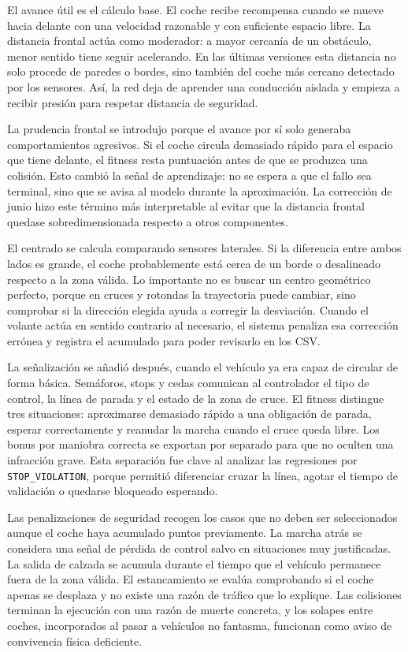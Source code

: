 El avance útil es el cálculo base. El coche recibe recompensa cuando se mueve hacia delante con una velocidad razonable y con suficiente espacio libre. La distancia frontal actúa como moderador: a mayor cercanía de un obstáculo, menor sentido tiene seguir acelerando. En las últimas versiones esta distancia no solo procede de paredes o bordes, sino también del coche más cercano detectado por los sensores. Así, la red deja de aprender una conducción aislada y empieza a recibir presión para respetar distancia de seguridad.

La prudencia frontal se introdujo porque el avance por sí solo generaba comportamientos agresivos. Si el coche circula demasiado rápido para el espacio que tiene delante, el fitness resta puntuación antes de que se produzca una colisión. Esto cambió la señal de aprendizaje: no se espera a que el fallo sea terminal, sino que se avisa al modelo durante la aproximación. La corrección de junio hizo este término más interpretable al evitar que la distancia frontal quedase sobredimensionada respecto a otros componentes.

El centrado se calcula comparando sensores laterales. Si la diferencia entre ambos lados es grande, el coche probablemente está cerca de un borde o desalineado respecto a la zona válida. Lo importante no es buscar un centro geométrico perfecto, porque en cruces y rotondas la trayectoria puede cambiar, sino comprobar si la dirección elegida ayuda a corregir la desviación. Cuando el volante actúa en sentido contrario al necesario, el sistema penaliza esa corrección errónea y registra el acumulado para poder revisarlo en los CSV\@.

La señalización se añadió después, cuando el vehículo ya era capaz de circular de forma básica. Semáforos, stops y cedas comunican al controlador el tipo de control, la línea de parada y el estado de la zona de cruce. El fitness distingue tres situaciones: aproximarse demasiado rápido a una obligación de parada, esperar correctamente y reanudar la marcha cuando el cruce queda libre. Los bonus por maniobra correcta se exportan por separado para que no oculten una infracción grave. Esta separación fue clave al analizar las regresiones por \texttt{STOP\_VIOLATION}, porque permitió diferenciar cruzar la línea, agotar el tiempo de validación o quedarse bloqueado esperando.

Las penalizaciones de seguridad recogen los casos que no deben ser seleccionados aunque el coche haya acumulado puntos previamente. La marcha atrás se considera una señal de pérdida de control salvo en situaciones muy justificadas. La salida de calzada se acumula durante el tiempo que el vehículo permanece fuera de la zona válida. El estancamiento se evalúa comprobando si el coche apenas se desplaza y no existe una razón de tráfico que lo explique. Las colisiones terminan la ejecución con una razón de muerte concreta, y los solapes entre coches, incorporados al pasar a vehículos no fantasma, funcionan como aviso de convivencia física deficiente.

